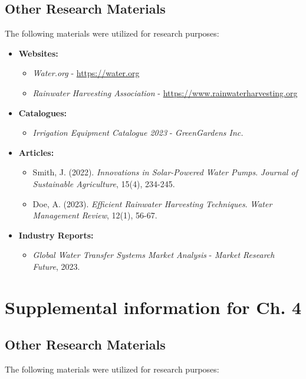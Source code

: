 \documentclass[12pt]{report}
\begin{document}
\section{Other Research Materials}
The following materials were utilized for research purposes:

\begin{itemize}
    \item \textbf{Websites:}
    \begin{itemize}
        \item \textit{Water.org} - \url{https://water.org}
        \item \textit{Rainwater Harvesting Association} - \url{https://www.rainwaterharvesting.org}
    \end{itemize}
    
    \item \textbf{Catalogues:}
    \begin{itemize}
        \item \textit{Irrigation Equipment Catalogue 2023} - \textit{GreenGardens Inc.}
    \end{itemize}
    
    \item \textbf{Articles:}
    \begin{itemize}
        \item Smith, J. (2022). \textit{Innovations in Solar-Powered Water Pumps}. \textit{Journal of Sustainable Agriculture}, 15(4), 234-245.
        \item Doe, A. (2023). \textit{Efficient Rainwater Harvesting Techniques}. \textit{Water Management Review}, 12(1), 56-67.
    \end{itemize}
    
    \item \textbf{Industry Reports:}
    \begin{itemize}
        \item \textit{Global Water Transfer Systems Market Analysis} - \textit{Market Research Future}, 2023.
    \end{itemize}
\end{itemize}


\chapter{Supplemental information for Ch. 4}
    \section{Other Research Materials}
    The following materials were utilized for research purposes:
    
\end{document}
